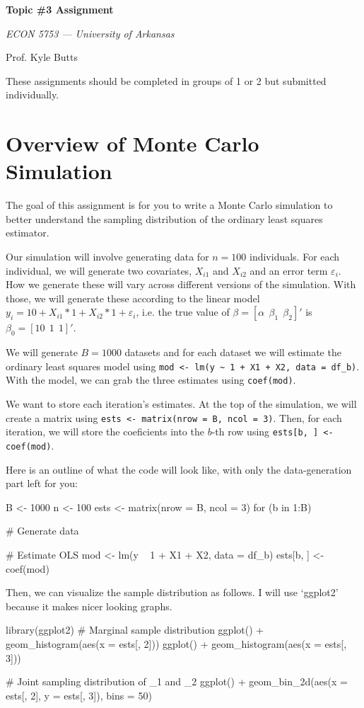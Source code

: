 \documentclass[12pt]{article}
\begin{document}
\begin{center}
  {\Huge\bf Topic \#3 Assignment}
  
  \smallskip
  {\large\it  ECON 5753 — University of Arkansas}

  \medskip
  {\large Prof. Kyle Butts}
\end{center}

These assignments should be completed in groups of 1 or 2 but submitted individually. 

\section*{Overview of Monte Carlo Simulation}

The goal of this assignment is for you to write a Monte Carlo simulation to better understand the sampling distribution of the ordinary least squares estimator.

Our simulation will involve generating data for $n = 100$ individuals. 
For each individual, we will generate two covariates, $X_{i1}$ and $X_{i2}$ and an error term $\varepsilon_i$. How we generate these will vary across different versions of the simulation. With those, we will generate these according to the linear model $y_i = 10 + X_{i1} * 1 + X_{i2} * 1 + \varepsilon_i$, i.e. the true value of $\beta = [\alpha \ \ \beta_1 \ \ \beta_2]'$ is $\beta_0 = [10 \ \ 1 \ \  1]'$.

We will generate $B = 1000$ datasets and for each dataset we will estimate the ordinary least squares model using \texttt{mod <- lm(y \textasciitilde \ 1 + X1 + X2, data = df\_b)}. With the model, we can grab the three estimates using \texttt{coef(mod)}. 

We want to store each iteration's estimates. At the top of the simulation, we will create a matrix using \texttt{ests <- matrix(nrow = B, ncol = 3)}. Then, for each iteration, we will store the coeficients into the $b$-th row using \texttt{ests[b, ] <- coef(mod)}. 

Here is an outline of what the code will look like, with only the data-generation part left for you:

\begin{codeblock}
B <- 1000
n <- 100
ests <- matrix(nrow = B, ncol = 3)
for (b in 1:B) {
  # Generate data
  
  # Estimate OLS
  mod <- lm(y ~ 1 + X1 + X2, data = df_b)
  ests[b, ] <- coef(mod)
}
\end{codeblock}

Then, we can visualize the sample distribution as follows. I will use `ggplot2' because it makes nicer looking graphs.
\begin{codeblock}
library(ggplot2)
# Marginal sample distribution
ggplot() + 
  geom_histogram(aes(x = ests[, 2]))
ggplot() + 
  geom_histogram(aes(x = ests[, 3]))

# Joint sampling distribution of \hat{\beta}_1 and \hat{\beta}_2
ggplot() + 
  geom_bin_2d(aes(x = ests[, 2], y = ests[, 3]), bins = 50) 
\end{codeblock}
\end{document}
